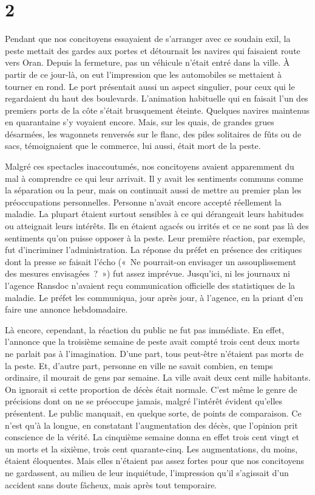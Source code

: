 \documentclass[french,twoside]{book} %
\begin{document}
\section[{2}]{2}
\noindent Pendant que nos concitoyens essayaient de s’arranger avec ce soudain exil, la peste mettait des gardes aux portes et détournait les navires qui faisaient route vers Oran. Depuis la fermeture, pas un véhicule n’était entré dans la ville. À partir de ce jour-là, on eut l’impression que les automobiles se mettaient à tourner en rond. Le port présentait aussi un aspect singulier, pour ceux qui le regardaient du haut des boulevards. L’animation habituelle qui en faisait l’un des premiers ports de la côte s’était brusquement éteinte. Quelques navires maintenus en quarantaine s’y voyaient encore. Mais, sur les quais, de grandes grues désarmées, les wagonnets renversés sur le flanc, des piles solitaires de fûts ou de sacs, témoignaient que le commerce, lui aussi, était mort de la peste.\par
Malgré ces spectacles inaccoutumés, nos concitoyens avaient apparemment du mal à comprendre ce qui leur arrivait. Il y avait les sentiments communs comme la séparation ou la peur, mais on continuait aussi de mettre au premier plan les préoccupations personnelles. Personne n’avait encore accepté réellement la maladie. La plupart étaient surtout sensibles à ce qui dérangeait leurs habitudes ou atteignait leurs intérêts. Ils en étaient agacés ou irrités et ce ne sont pas là des sentiments qu’on puisse opposer à la peste. Leur première réaction, par exemple, fut d’incriminer l’administration. La réponse du préfet en présence des critiques dont la presse se faisait l’écho (« Ne pourrait-on envisager un assouplissement des mesures envisagées ? ») fut assez imprévue. Jusqu’ici, ni les journaux ni l’agence Ransdoc n’avaient reçu communication officielle des statistiques de la maladie. Le préfet les communiqua, jour après jour, à l’agence, en la priant d’en faire une annonce hebdomadaire.\par
Là encore, cependant, la réaction du public ne fut pas immédiate. En effet, l’annonce que la troisième semaine de peste avait compté trois cent deux morts ne parlait pas à l’imagination. D’une part, tous peut-être n’étaient pas morts de la peste. Et, d’autre part, personne en ville ne savait combien, en temps ordinaire, il mourait de gens par semaine. La ville avait deux cent mille habitants. On ignorait si cette proportion de décès était normale. C’est même le genre de précisions dont on ne se préoccupe jamais, malgré l’intérêt évident qu’elles présentent. Le public manquait, en quelque sorte, de points de comparaison. Ce n’est qu’à la longue, en constatant l’augmentation des décès, que l’opinion prit conscience de la vérité. La cinquième semaine donna en effet trois cent vingt et un morts et la sixième, trois cent quarante-cinq. Les augmentations, du moins, étaient éloquentes. Mais elles n’étaient pas assez fortes pour que nos concitoyens ne gardassent, au milieu de leur inquiétude, l’impression qu’il s’agissait d’un accident sans doute fâcheux, mais après tout temporaire.\par
\end{document}
